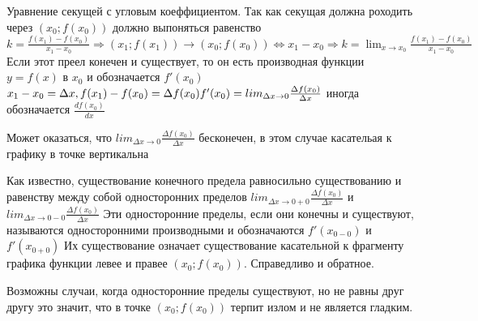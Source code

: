 \documentclass[oneside]{book}
\begin{document}
\begin{enumerate}
\par Уравнение секущей с угловым коеффициентом. Так как секущая должна роходить через $(x_0; f(x_0))$ должно выпоняться равенство $k = \frac{f(x_1) - f(x_0)}{x_1 - x_0} \Rightarrow (x_1; f(x_1)) \rightarrow (x_0; f(x_0)) \Leftrightarrow x_1 - x_0 \Rightarrow
k = \lim_{x \rightarrow x_0}{\frac{f(x_1) - f(x_0)}{x_1 - x_0}}$ Если этот преел конечен и существует, то он есть производная функции
$y = f(x)$ в $x_0$ и обозначается $f'(x_0)$ \\
$x_1 - x_0 = \Delta x, f(x_1) - f(x_0) = \Delta f(x_0) \\ f'(x_0) = lim_{\Delta x \rightarrow 0}{\frac{\Delta f(x_0)}{\Delta x}}$ иногда обозначается $\frac{df(x_0)}{dx}$ \par Может оказаться, что $lim_{\Delta x \rightarrow 0}{\frac{\Delta f(x_0)}{\Delta x}}$ бесконечен,
в этом случае касательая к графику в точке вертикальна
\par Как известно, существование конечного предела равносильно существованию и равенству между собой односторонних пределов $lim_{\Delta x \rightarrow 0+0}{\frac{\Delta f(x_0)}{\Delta x}}$ и $lim_{\Delta x \rightarrow 0-0}{\frac{\Delta f(x_0)}{\Delta x}}$
Эти односторонние пределы, если они конечны и существуют, называются односторонними производными и обозначаются $f'(x_{0-0})$ и $f'(x_{0+0})$
Их существование означает существование касательной к фрагменту графика функции левее и правее $(x_0; f(x_0))$. Справедливо и обратное.
\par Возможны случаи, когда односторонние пределы существуют, но не равны друг другу это значит, что в точке $(x_0; f(x_0))$ терпит излом и не является гладким.


\end{enumerate}
\end{document}
